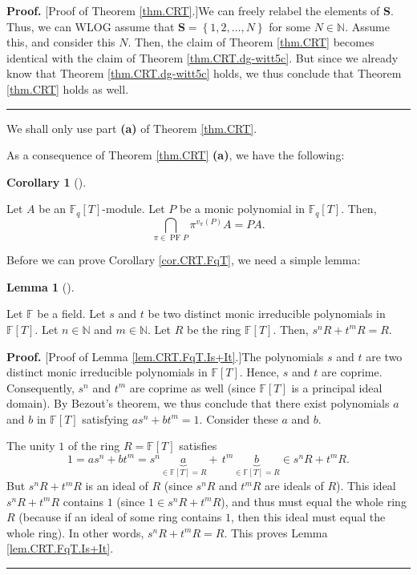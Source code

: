\documentclass[numbers=enddot,12pt,final,onecolumn,notitlepage]{scrartcl}%
\theoremstyle{definition}
\newtheorem{lem}[theo]{Lemma}
\newenvironment{lemma}[1][]
{\begin{lem}[#1]\begin{leftbar}}
{\end{leftbar}\end{lem}}
\newtheorem{coro}[theo]{Corollary}
\newenvironment{corollary}[1][]
{\begin{coro}[#1]\begin{leftbar}}
{\end{leftbar}\end{coro}}
\newenvironment{proof}[1][Proof]{\noindent\textbf{#1.} }{\ \rule{0.5em}{0.5em}}
\begin{document}
\begin{proof}
[Proof of Theorem \ref{thm.CRT}.]We can freely relabel the elements of
$\mathbf{S}$. Thus, we can WLOG assume that $\mathbf{S}=\left\{
1,2,\ldots,N\right\}  $ for some $N\in\mathbb{N}$. Assume this, and consider
this $N$. Then, the claim of Theorem \ref{thm.CRT} becomes identical with the
claim of Theorem \ref{thm.CRT.dg-witt5c}. But since we already know that
Theorem \ref{thm.CRT.dg-witt5c} holds, we thus conclude that Theorem
\ref{thm.CRT} holds as well.
\end{proof}

We shall only use part \textbf{(a)} of Theorem \ref{thm.CRT}.

As a consequence of Theorem \ref{thm.CRT} \textbf{(a)}, we have the following:

\begin{corollary}
\label{cor.CRT.FqT}Let $A$ be an $\mathbb{F}_{q}\left[  T\right]  $-module.
Let $P$ be a monic polynomial in $\mathbb{F}_{q}\left[  T\right]  $. Then,
\[
\bigcap_{\pi\in\operatorname*{PF}P}\pi^{v_{\pi}\left(  P\right)  }A=PA.
\]

\end{corollary}

Before we can prove Corollary \ref{cor.CRT.FqT}, we need a simple lemma:

\begin{lemma}
\label{lem.CRT.FqT.Is+It}Let $\mathbb{F}$ be a field. Let $s$ and $t$ be two
distinct monic irreducible polynomials in $\mathbb{F}\left[  T\right]  $. Let
$n\in\mathbb{N}$ and $m\in\mathbb{N}$. Let $R$ be the ring $\mathbb{F}\left[
T\right]  $. Then, $s^{n}R+t^{m}R=R$.
\end{lemma}

\begin{proof}
[Proof of Lemma \ref{lem.CRT.FqT.Is+It}.]The polynomials $s$ and $t$ are two
distinct monic irreducible polynomials in $\mathbb{F}\left[  T\right]  $.
Hence, $s$ and $t$ are coprime. Consequently, $s^{n}$ and $t^{m}$ are coprime
as well (since $\mathbb{F}\left[  T\right]  $ is a principal ideal domain). By
Bezout's theorem, we thus conclude that there exist polynomials $a$ and $b$ in
$\mathbb{F}\left[  T\right]  $ satisfying $as^{n}+bt^{m}=1$. Consider these
$a$ and $b$.

The unity $1$ of the ring $R=\mathbb{F}\left[  T\right]  $ satisfies
\[
1=as^{n}+bt^{m}=s^{n}\underbrace{a}_{\in\mathbb{F}\left[  T\right]
=R}+\,t^{m}\underbrace{b}_{\in\mathbb{F}\left[  T\right]  =R}\in s^{n}%
R+t^{m}R.
\]
But $s^{n}R+t^{m}R$ is an ideal of $R$ (since $s^{n}R$ and $t^{m}R$ are ideals
of $R$). This ideal $s^{n}R+t^{m}R$ contains $1$ (since $1\in s^{n}R+t^{m}R$),
and thus must equal the whole ring $R$ (because if an ideal of some ring
contains $1$, then this ideal must equal the whole ring). In other words,
$s^{n}R+t^{m}R=R$. This proves Lemma \ref{lem.CRT.FqT.Is+It}.
\end{proof}
\end{document}
